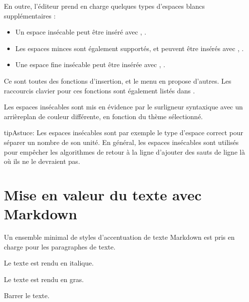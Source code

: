 \documentclass[a4paper,11pt,french]{sphinxmanual}
\begin{document}
\sphinxAtStartPar
En outre, l’éditeur prend en charge quelques types d’espaces blancs supplémentaires :
\begin{itemize}
\item {} 
\sphinxAtStartPar
Un espace insécable peut être inséré avec , .

\item {} 
\sphinxAtStartPar
Les espaces minces sont également supportés, et peuvent être insérés avec , .

\item {} 
\sphinxAtStartPar
Une espace fine insécable peut être insérée avec , .

\end{itemize}

\sphinxAtStartPar
Ce sont toutes des fonctions d’insertion, et le menu  en propose d’autres. Les raccourcis clavier pour ces fonctions sont également listés dans {\hyperref[\detokenize{usage_shortcuts:a-kb-ins}]{}}.

\sphinxAtStartPar
Les espaces insécables sont mis en évidence par le surligneur syntaxique avec un arrière\sphinxhyphen{}plan de couleur différente, en fonction du thème sélectionné.

\begin{sphinxadmonition}{tip}{Astuce:}
\sphinxAtStartPar
Les espaces insécables sont par exemple le type d’espace correct pour séparer un nombre de son unité. En général, les espaces insécables sont utilisés pour empêcher les algorithmes de retour à la ligne d’ajouter des sauts de ligne là où ils ne le devraient pas.
\end{sphinxadmonition}


\section{Mise en valeur du texte avec Markdown}
\label{\detokenize{usage_format:text-emphasis-with-markdown}}\label{\detokenize{usage_format:a-fmt-emph}}
\sphinxAtStartPar
Un ensemble minimal de styles d’accentuation de texte Markdown est pris en charge pour les paragraphes de texte.
\begin{description}
\sphinxAtStartPar
Le texte est rendu en italique.

\sphinxAtStartPar
Le texte est rendu en gras.

\sphinxAtStartPar
Barrer le texte.

\end{description}
\end{document}
